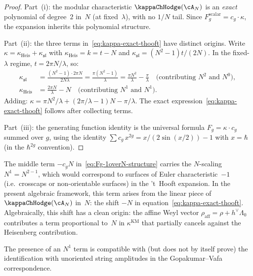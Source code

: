 \begin{proof}
Part~(i): the modular characteristic $\kappaChHodge(\cA_N)$ is an
\emph{exact} polynomial of degree~$2$ in~$N$ (at fixed~$\lambda$),
with no $1/N$ tail. Since $F_g^{\mathrm{scalar}} = c_g \cdot \kappa$,
the expansion inherits this polynomial structure.

Part~(ii): the three terms in~\eqref{eq:kappa-exact-thooft} have
distinct origins. Write $\kappa = \kappa_{\mathrm{Heis}}
+ \kappa_{\mathfrak{sl}}$ with $\kappa_{\mathrm{Heis}} = k = t - N$
and $\kappa_{\mathfrak{sl}} = (N^2-1)t/(2N)$. In the
fixed-$\lambda$ regime, $t = 2\pi N/\lambda$, so:
\begin{align*}
\kappa_{\mathfrak{sl}} &= \frac{(N^2-1) \cdot 2\pi N}{2N\lambda}
= \frac{\pi(N^2 - 1)}{\lambda}
= \frac{\pi N^2}{\lambda} - \frac{\pi}{\lambda}
\quad \text{(contributing $N^2$ and $N^0$)}, \\
\kappa_{\mathrm{Heis}} &= \frac{2\pi N}{\lambda} - N
\quad \text{(contributing $N^1$ and $N^1$)}.
\end{align*}
Adding: $\kappa = \pi N^2/\lambda + (2\pi/\lambda - 1)N
- \pi/\lambda$. The exact expression~\eqref{eq:kappa-exact-thooft}
follows after collecting terms.

Part~(iii): the generating function identity is the
universal formula $F_g = \kappa \cdot c_g$ summed over $g$, using the
identity $\sum c_g\, x^{2g} = x/(2\sin(x/2)) - 1$ with $x = \hbar$
(in the $\hbar^{2g}$ convention).
\end{proof}

\begin{remark}
\label{rem:N1-euler-characteristic}
The middle term $-c_g N$ in~\eqref{eq:Fg-1overN-structure} carries
the $N$-scaling $N^1 = N^{2-1}$, which would correspond to
surfaces of Euler characteristic~$-1$ (i.e.\ crosscaps or
non-orientable surfaces) in the 't~Hooft expansion. In the
present algebraic framework, this term arises from the linear piece
of $\kappaChHodge(\cA_N)$ in~$N$: the shift $-N$ in
equation~\eqref{eq:kappa-exact-thooft}. Algebraically,
this shift has a clean origin: the affine Weyl vector
$\rho_{\mathrm{aff}} = \rho + h^\vee \Lambda_0$ contributes
a term proportional to~$N$ in $\kappa^{\mathrm{KM}}$ that partially
cancels against the Heisenberg contribution.

The presence of an $N^1$ term is compatible with (but does not by
itself prove) the identification with unoriented string amplitudes
in the Gopakumar--Vafa correspondence.
\end{remark}

